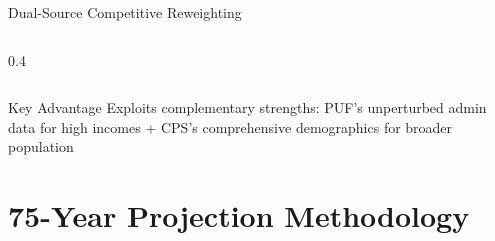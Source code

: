 \documentclass[11pt,aspectratio=169]{beamer}
\begin{document}
\begin{frame}{Dual-Source Competitive Reweighting}
\begin{columns}
\begin{column}{0.4\textwidth}

\end{column}
\end{columns}

\vspace{0.3cm}

\begin{block}{Key Advantage}
Exploits complementary strengths: PUF's unperturbed admin data for high incomes + CPS's comprehensive demographics for broader population
\end{block}

\end{frame}


\section{75-Year Projection Methodology}
\end{document}

